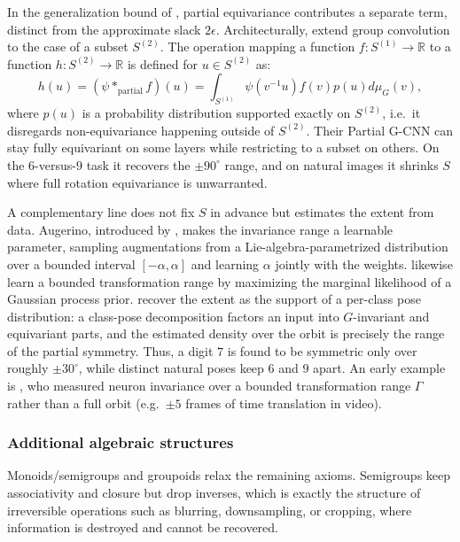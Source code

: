 \documentclass[mathematics,review,submit,moreauthors]{Definitions/mdpi}
\begin{document}
In the generalization bound of \citet{petrache2023}, partial equivariance contributes a separate term, distinct from the approximate slack $2\epsilon$.
Architecturally, \citet{romero2023} extend group convolution to the case of a subset $S^{(2)}$.
The operation mapping a function $f:S^{(1)}\to\mathbb{R}$ to a function $h:S^{(2)}\to\mathbb{R}$ is defined for $u\in S^{(2)}$ as:$$h(u) = (\psi *_{\mathrm{partial}} f)(u) = \int_{S^{(1)}} \psi(v^{-1}u)f(v) p(u) d\mu_{G}(v),$$ where $p(u)$ is a probability distribution supported exactly on $S^{(2)}$, i.e.\ it disregards non-equivariance happening outside of $S^{(2)}$.
Their Partial G-CNN can stay fully equivariant on some layers while restricting to a subset on others.
On the $6$-versus-$9$ task it recovers the $\pm 90^\circ$ range, and on natural images it shrinks $S$ where full rotation equivariance is unwarranted.

A complementary line does not fix $S$ in advance but estimates the extent from data.
Augerino, introduced by \citet{benton2020anips}, makes the invariance range a learnable parameter, sampling augmentations from a Lie-algebra-parametrized distribution over a bounded interval $[-\alpha,\alpha]$ and learning $\alpha$ jointly with the weights.
\citet{vanderwilk2018anips} likewise learn a bounded transformation range by maximizing the marginal likelihood of a Gaussian process prior.
\citet{urbano2026} recover the extent as the support of a per-class pose distribution: a class-pose decomposition factors an input into $G$-invariant and equivariant parts, and the estimated density over the orbit is precisely the range of the partial symmetry.
Thus, a digit $7$ is found to be symmetric only over roughly $\pm 30^\circ$, while distinct natural poses keep $6$ and $9$ apart.
An early example is \citet{goodfellow2009anips}, who measured neuron invariance over a bounded transformation range $\Gamma$ rather than a full orbit (e.g.\ $\pm 5$ frames of time translation in video).

\subsubsection{Additional algebraic structures}
Monoids/semigroups and groupoids relax the remaining axioms.
Semigroups keep associativity and closure but drop inverses, which is exactly the structure of irreversible operations such as blurring, downsampling, or cropping, where information is destroyed and cannot be recovered.
\end{document}
